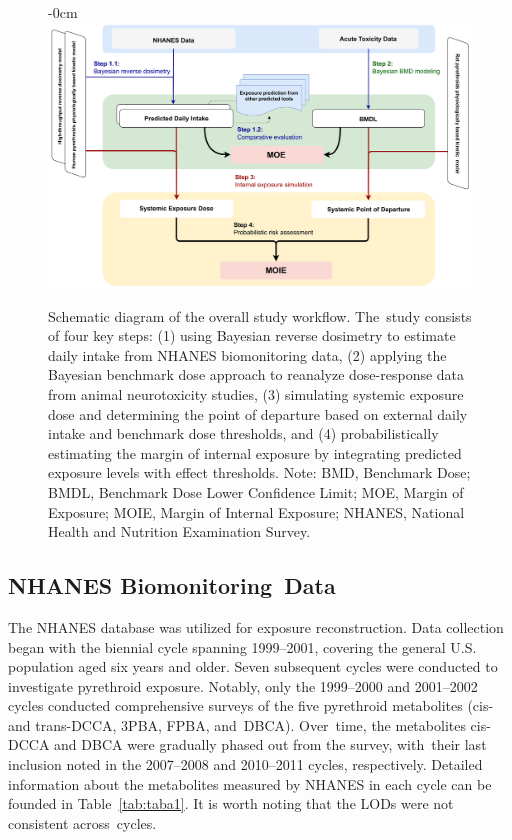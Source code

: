 \documentclass[toxics,article,accept,pdftex,moreauthors]{Definitions/mdpi}
\begin{document}
\vspace{-7pt}\begin{figure}[H]
\begin{adjustwidth}{-\extralength}{0cm}
\includegraphics[width=\linewidth]{figures/fig1_workflow}
\end{adjustwidth}
\caption{Schematic diagram of the overall study workflow. The~study consists of 
four key steps: (1) using Bayesian reverse dosimetry to estimate daily intake from 
NHANES biomonitoring data, (2) applying 
the Bayesian benchmark dose approach to reanalyze dose-response data from animal 
neurotoxicity studies, (3) simulating systemic exposure dose and determining the 
point of departure based on external daily intake and benchmark dose thresholds, 
and (4) probabilistically estimating the margin of internal exposure by integrating 
predicted exposure levels with effect thresholds. Note: BMD, Benchmark Dose; BMDL,
Benchmark Dose Lower Confidence Limit; MOE, Margin of Exposure; 
MOIE, Margin of Internal Exposure; NHANES, National Health and Nutrition Examination Survey.\label{fig1}}
\end{figure}
\unskip


\subsection{NHANES Biomonitoring~Data}\label{nhanes-biomonitoring-data}

The NHANES database was utilized for exposure reconstruction. Data
collection began with the biennial cycle spanning 1999--2001, covering
the general U.S. population aged six years and older. Seven subsequent
cycles were conducted to investigate pyrethroid exposure. Notably, only
the 1999--2000 and 2001--2002 cycles conducted comprehensive surveys of
the five pyrethroid metabolites (cis- and trans-DCCA, 3PBA, FPBA, and~DBCA). Over~time,
the metabolites cis-DCCA and DBCA were gradually phased out from the
survey, with~their last inclusion noted in the 2007--2008 and 2010--2011
cycles, respectively. Detailed information about the metabolites
measured by NHANES in each cycle can be founded in Table~\ref{tab:taba1}.
It is worth noting that the LODs were not consistent across~cycles.
\end{document}
